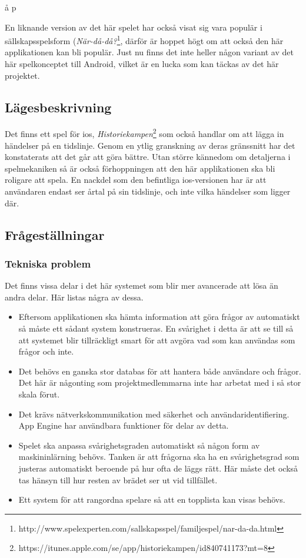 å p\documentclass[swedish,12pt,a4paper]{article}
\begin{document}
En liknande version av det här spelet har också visat sig vara populär i sällskapsspelsform (\textit{När-då-då?}\footnote{http://www.spelexperten.com/sallskapsspel/familjespel/nar-da-da.html}, därför är hoppet högt om att också den här applikationen kan bli populär. Just nu finns det inte heller någon variant av det här spelkonceptet till Android, vilket är en lucka som kan täckas av det här projektet.

\subsection{Lägesbeskrivning}
Det finns ett spel för ios, \textit{Historiekampen}\footnote{https://itunes.apple.com/se/app/historiekampen/id840741173?mt=8} som också handlar om att lägga in händelser på en tidslinje. Genom en ytlig granskning av deras gränssnitt har det konstaterats att det går att göra bättre. Utan större kännedom om detaljerna i spelmekaniken så är också förhoppningen att den här applikationen ska bli roligare att spela. En nackdel som den befintliga ios-versionen har är att användaren endast ser årtal på sin tidslinje, och inte vilka händelser som ligger där.

\subsection{Frågeställningar}

\subsubsection{Tekniska problem}
Det finns vissa delar i det här systemet som blir mer avancerade att lösa än andra delar. Här listas några av dessa.
\begin{itemize}
\item Eftersom applikationen ska hämta information att göra frågor av automatiskt så måste ett sådant system konstrueras. En svårighet i detta är att se till så att systemet blir tillräckligt smart för att avgöra vad som kan användas som frågor och inte.
\item Det behövs en ganska stor databas för att hantera både användare och frågor. Det här är någonting som projektmedlemmarna inte har arbetat med i så stor skala förut.
\item Det krävs nätverkskommunikation med säkerhet och användaridentifiering. App Engine har användbara funktioner för delar av detta.
\item Spelet ska anpassa svårighetsgraden automatiskt så någon form av maskininlärning behövs. Tanken är att frågorna ska ha en svårighetsgrad som justeras automatiskt beroende på hur ofta de läggs rätt. Här måste det också tas hänsyn till hur resten av brädet ser ut vid tillfället.
\item Ett system för att rangordna spelare så att en topplista kan visas behövs.
\end{itemize}
\end{document}
